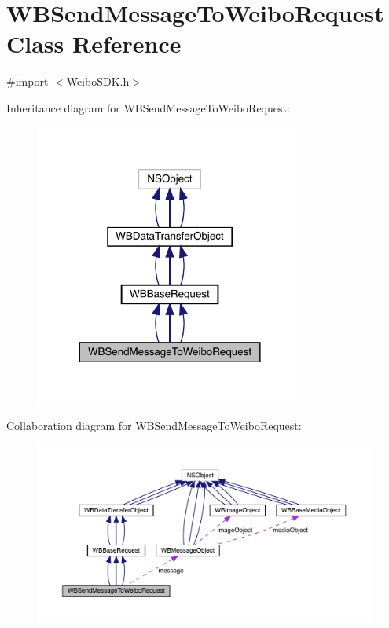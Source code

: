 \hypertarget{interface_w_b_send_message_to_weibo_request}{}\section{W\+B\+Send\+Message\+To\+Weibo\+Request Class Reference}
\label{interface_w_b_send_message_to_weibo_request}


{\ttfamily \#import $<$Weibo\+S\+D\+K.\+h$>$}



Inheritance diagram for W\+B\+Send\+Message\+To\+Weibo\+Request\+:\nopagebreak
\begin{figure}[H]
\begin{center}
\leavevmode
\includegraphics[width=252pt]{interface_w_b_send_message_to_weibo_request__inherit__graph}
\end{center}
\end{figure}


Collaboration diagram for W\+B\+Send\+Message\+To\+Weibo\+Request\+:\nopagebreak
\begin{figure}[H]
\begin{center}
\leavevmode
\includegraphics[width=350pt]{interface_w_b_send_message_to_weibo_request__coll__graph}
\end{center}
\end{figure}
